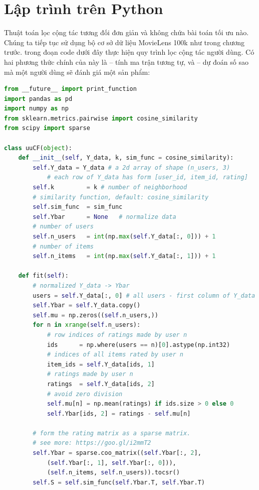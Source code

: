 \section{Lập trình trên Python }
\label{sec:24_python}
Thuật toán lọc cộng tác tương đối đơn giản và không
chứa bài toán tối ưu nào. Chúng ta tiếp tục sử dụng bộ cơ sở dữ liệu MovieLens
100k như trong chương trước.  trong đoạn code dưới đây thực hiện quy trình lọc cộng tác người dùng. Có hai phương thức chính của
 này là  -- tính ma trận tương tự, và
 -- dự đoán số sao mà một người dùng sẽ đánh giá một
sản phẩm:
 \newpage 
\begin{lstlisting}[language=Python]
from __future__ import print_function 
import pandas as pd 
import numpy as np
from sklearn.metrics.pairwise import cosine_similarity
from scipy import sparse 

class uuCF(object):
    def __init__(self, Y_data, k, sim_func = cosine_similarity):
        self.Y_data = Y_data # a 2d array of shape (n_users, 3)
            # each row of Y_data has form [user_id, item_id, rating]
        self.k         = k # number of neighborhood
        # similarity function, default: cosine_similarity
        self.sim_func  = sim_func 
        self.Ybar      = None   # normalize data 
        # number of users
        self.n_users   = int(np.max(self.Y_data[:, 0])) + 1 
        # number of items
        self.n_items   = int(np.max(self.Y_data[:, 1])) + 1
    
    def fit(self):
        # normalized Y_data -> Ybar 
        users = self.Y_data[:, 0] # all users - first column of Y_data
        self.Ybar = self.Y_data.copy()
        self.mu = np.zeros((self.n_users,))
        for n in xrange(self.n_users):
            # row indices of ratings made by user n
            ids      = np.where(users == n)[0].astype(np.int32)
            # indices of all items rated by user n 
            item_ids = self.Y_data[ids, 1] 
            # ratings made by user n 
            ratings  = self.Y_data[ids, 2]  
            # avoid zero division 
            self.mu[n] = np.mean(ratings) if ids.size > 0 else 0 
            self.Ybar[ids, 2] = ratings - self.mu[n]
            
        # form the rating matrix as a sparse matrix. 
        # see more: https://goo.gl/i2mmT2
        self.Ybar = sparse.coo_matrix((self.Ybar[:, 2],
            (self.Ybar[:, 1], self.Ybar[:, 0])), 
            (self.n_items, self.n_users)).tocsr()
        self.S = self.sim_func(self.Ybar.T, self.Ybar.T)
    

\end{lstlisting}
